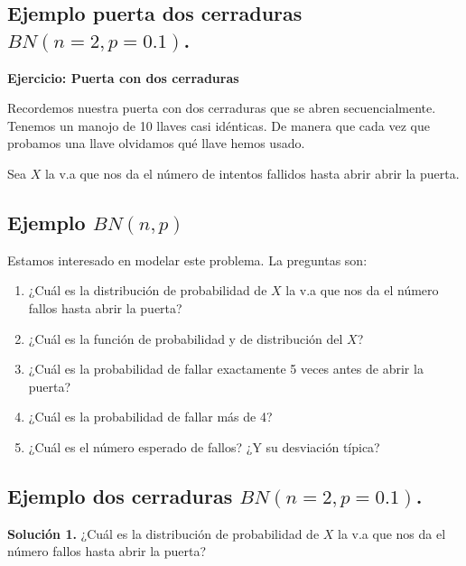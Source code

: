 \documentclass[]{book}
\providecommand{\tightlist}{%
  \setlength{\itemsep}{0pt}\setlength{\parskip}{0pt}}
\begin{document}
\hypertarget{ejemplo-puerta-dos-cerraduras-bnn2p0.1.}{%
\subsection{\texorpdfstring{Ejemplo puerta dos cerraduras \(BN(n=2,p=0.1)\).}{Ejemplo puerta dos cerraduras BN(n=2,p=0.1).}}\label{ejemplo-puerta-dos-cerraduras-bnn2p0.1.}}

\textbf{Ejercicio: Puerta con dos cerraduras}

Recordemos nuestra puerta con dos cerraduras que se abren secuencialmente. Tenemos un manojo de 10 llaves casi idénticas. De manera que cada vez que probamos una llave olvidamos qué llave hemos usado.

Sea \(X\) la v.a que nos da el número de intentos fallidos hasta abrir abrir la puerta.

\hypertarget{ejemplo-bnnp}{%
\subsection{\texorpdfstring{Ejemplo \(BN(n,p)\)}{Ejemplo BN(n,p)}}\label{ejemplo-bnnp}}

Estamos interesado en modelar este problema. La preguntas son:

\begin{enumerate}
\def\labelenumi{\arabic{enumi}.}
\tightlist
\item
  ¿Cuál es la distribución de probabilidad de \(X\) la v.a que nos da el número fallos hasta abrir la puerta?
\item
  ¿Cuál es la función de probabilidad y de distribución del \(X\)?
\item
  ¿Cuál es la probabilidad de fallar exactamente 5 veces antes de abrir la puerta?
\item
  ¿Cuál es la probabilidad de fallar más de 4?
\item
  ¿Cuál es el número esperado de fallos? ¿Y su desviación típica?
\end{enumerate}

\hypertarget{ejemplo-dos-cerraduras-bnn2p0.1.}{%
\subsection{\texorpdfstring{Ejemplo dos cerraduras \(BN(n=2,p=0.1)\).}{Ejemplo dos cerraduras BN(n=2,p=0.1).}}\label{ejemplo-dos-cerraduras-bnn2p0.1.}}

\textbf{Solución 1.} ¿Cuál es la distribución de probabilidad de \(X\) la v.a que nos da el número fallos hasta abrir la puerta?
\end{document}
